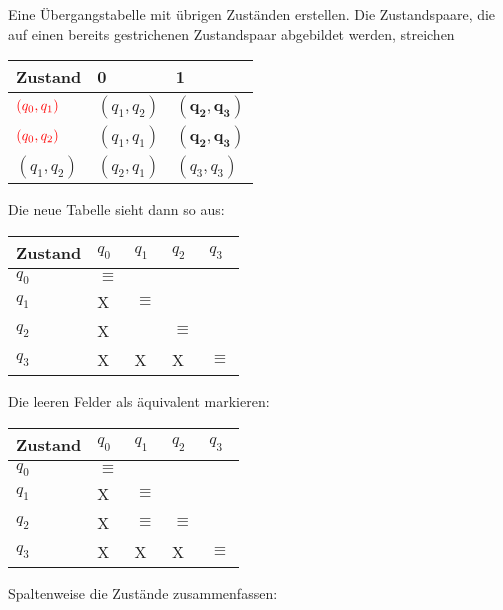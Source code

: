 Eine Übergangstabelle mit übrigen Zuständen erstellen. Die Zustandspaare, die auf einen bereits gestrichenen Zustandspaar abgebildet werden, streichen
\begin{table}[H]
    \centering
    \begin{tabular}{|l|l|l|}
    \hline
    Zustand      & 0           & 1           \\ \hline
    $\color{red}(q_0,q_1)$  & $(q_1,q_2)$ & $\mathbf{(q_2,q_3)}$ \\ \hline
    $\color{red}(q_0,q_2)$  & $(q_1,q_1)$ & $\mathbf{(q_2,q_3)}$ \\ \hline
    $(q_1,q_2)$  & $(q_2,q_1)$ & $(q_3,q_3)$ \\ \hline
    \end{tabular}
\end{table}
Die neue Tabelle sieht dann so aus:
\begin{table}[H]
    \centering
    \begin{tabular}{|l|l|l|l|l|}
    \hline
    Zustand    & $q_0$    &     $q_1$       & $q_2$    & $q_3$    \\ \hline
    $q_0$      & $\equiv$ &                 &          &          \\ \hline
    $q_1$      &    X     &     $\equiv$    &          &          \\ \hline
    $q_2$      &    X     &                 & $\equiv$ &          \\ \hline
    $q_3$      &    X     &     X           &    X     & $\equiv$ \\ \hline
    \end{tabular}
\end{table}
Die leeren Felder als äquivalent markieren:
\begin{table}[H]
    \centering
    \begin{tabular}{|l|l|l|l|l|}
    \hline
    Zustand    & $q_0$    &     $q_1$       & $q_2$    & $q_3$    \\ \hline
    $q_0$      & $\equiv$ &                 &          &          \\ \hline
    $q_1$      &    X     &     $\equiv$    &          &          \\ \hline
    $q_2$      &    X     &     $\equiv$    & $\equiv$ &          \\ \hline
    $q_3$      &    X     &     X           &    X     & $\equiv$ \\ \hline
    \end{tabular}
\end{table}
Spaltenweise die Zustände zusammenfassen:
\begin{figure}[H]
    \centering
    \begin{transitiongraph}[fa]
    \end{transitiongraph}
\end{figure}